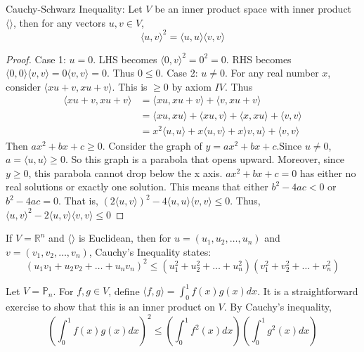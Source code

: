 \documentclass[12pt]{article}
\begin{document}
\begin{theorem} Cauchy-Schwarz Inequality: Let $V$ be an inner product space with inner product $\langle \rangle$, then for any vectors $u, v \in V$, $$ \langle u, v \rangle^2 = \langle u, u \rangle \langle v, v\rangle $$ \end{theorem} 
\begin{proof} Case 1: $u = 0$. LHS becomes $\langle 0, v \rangle^2 = 0^2 = 0$. RHS becomes $\langle 0, 0\rangle \langle v, v \rangle = 0\langle v, v \rangle = 0$. Thus $0 \leq 0$. \newline Case 2: $u \neq 0$. For any real number $x$, consider $\langle xu + v, xu + v \rangle$. This is $\geq 0$ by axiom $IV$. Thus $$\begin{aligned} \langle xu + v, xu + v \rangle &= \langle xu, xu + v \rangle + \langle v, xu + v \rangle \\ &= \langle xu, xu \rangle + \langle xu, v \rangle + \langle x, xu \rangle + \langle v, v \rangle \\ &= x^2\langle u, u \rangle + x\langle u, v \rangle + x\rangle v, u \rangle + \langle v, v \rangle \end{aligned}$$ Then $ax^2 + bx + c \geq 0$. Consider the graph of $y = ax^2 + bx + c$.Since $u \neq 0$, $a = \langle u, u \rangle \geq 0$. So this graph is a parabola that opens upward. Moreover, since $y \geq 0$, this parabola cannot drop below the x axis. $ax^2 + bx + c = 0$ has either no real solutions or exactly one solution. This means that either $b^2 - 4ac < 0$ or $b^2 - 4ac = 0$. That is, $(2\langle u, v \rangle)^2 - 4\langle u, u \rangle\langle v, v\rangle \leq 0$. Thus, $\langle u, v \rangle^2 - 2\langle u, v \rangle\langle v, v\rangle \leq 0$ \end{proof} 
\begin{example} If $V = \mathbb{R}^n$ and $\langle \rangle$ is Euclidean, then for $u = (u_1, u_2, \dots, u_n)$ and $v = (v_1, v_2, \dots, v_n)$, Cauchy's Inequality states: $$ (u_1v_1 + u_2v_2 + \dots + u_nv_n)^2 \leq (u_1^2 + u_2^2 + \dots + u_n^2)(v_1^2 + v_2^2 + \dots + v_n^2)$$ \end{example} 
\begin{example} Let $V = \mathbb{P}_n$. For $f, g \in V$, define $\langle f, g \rangle = \int_0^1 f(x)g(x)dx$. It is a straightforward exercise to show that this is an inner product on $V$. By Cauchy's inequality, $$(\int_0^1 f(x)g(x)dx)^2 \leq (\int_0^1 f^2(x)dx)(\int_0^1 g^2(x)dx) $$ \end{example} 
\end{document}
